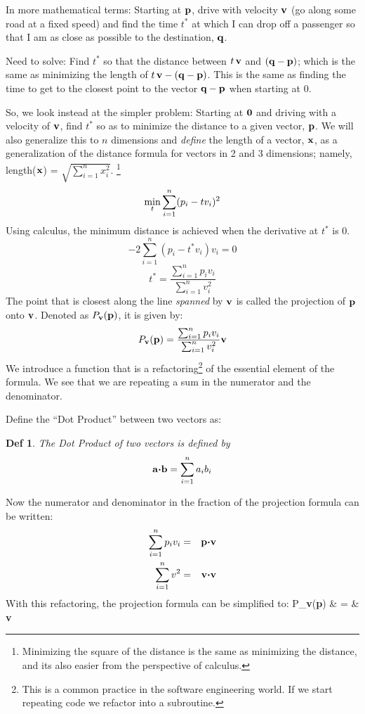\documentclass[12pt]{article}
\newtheorem{DD}{Def}
\begin{document}
{In more mathematical terms: Starting at ${\bf p}$, drive with velocity 
${\bf v}$ (go along some road at a fixed speed) and find the time $t^*$ at 
which I can drop off a passenger so that I am as close as possible to the 
destination, ${\bf q}$. 

Need to solve: Find $t^*$ so that the distance between $t \, {\bf v}$ and 
$({\bf q} - {\bf p})$; which is the same as minimizing the length of 
$t \, {\bf v} - ({\bf q} - {\bf p})$. 
This is the same as finding the time to get to the closest point to the 
vector ${\bf q} - {\bf p}$ when starting at $0$.

So, we look instead at the simpler problem: Starting at ${\bf 0}$ and 
driving with a velocity of ${\bf v}$, find $t^*$ so as to minimize the 
distance to a given vector, ${\bf p}$.
We will also generalize this to $n$ dimensions and {\em define\/} the 
length of a vector, ${\bf x}$, as a generalization of the distance formula 
for vectors in 2 and 3  dimensions; namely, 
length(${\bf x}$) = $\sqrt{\sum_{i=1}^n x_i^2}$.%
\footnote{Minimizing the square of the distance is the same as minimizing 
the distance, and its also easier from the perspective of calculus.}
$$ \mathop{\rm min}_{t} \sum_{i=1}^n (p_i - t v_i)^2 $$
Using calculus, the minimum distance is achieved when the derivative 
at $t^*$ is $0$.$$ -2 \sum_{i=1}^n (p_i - t^* v_i)v_i = 0$$
$$t^* = \frac{\sum_{i=1}^n p_i v_i}{\sum_{i=1}^n v_i^2}$$
The point that is closest along the line {\em spanned\/} by ${\bf v}$ is 
called the projection of ${\bf p}$ onto ${\bf v}$.
Denoted as $P_{\bf v}({\bf p})$, it is given by:
$$ P_{\bf v}({\bf p}) = \frac{\sum_{i=1}^n p_i v_i}{\sum_{i=1}^n v_i^2} \bf v $$
We introduce a function that is a refactoring\footnote{This is a common 
practice in the software engineering world. If we start repeating code we refactor into 
a subroutine.} of the essential element of the formula. 
We see that we are repeating a sum in the numerator and the denominator.

Define the ``Dot Product'' between two vectors as: 
\begin{DD}{The Dot Product of two vectors is defined by}
$${\bf a} {\boldsymbol \cdot} {\bf b} = \sum_{i=1}^n a_i b_i$$
\end{DD}
Now the numerator and denominator in the fraction of the projection 
formula can be written:
\begin{eqnarray*}
  \sum_{i=1}^n p_i v_i & = & {\bf p} {\boldsymbol \cdot} {\bf v} \\
  \sum_{i=1}^n v^2 & = & {\bf v} {\boldsymbol \cdot} {\bf v}
\end{eqnarray*}
With this refactoring, the projection formula can be simplified to:
\be
  P_{\bf v}({\bf p}) & = &  {\bf v}
\ee

}
\end{document}
